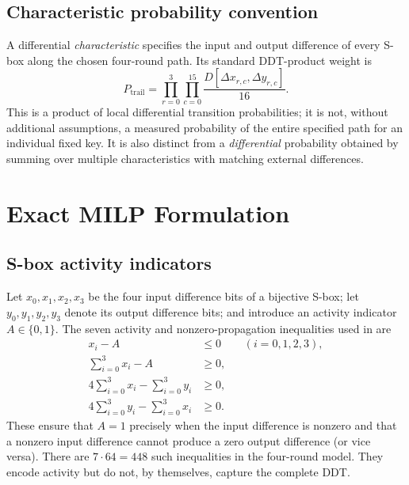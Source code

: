 \documentclass[11pt,a4paper]{article}
\begin{document}
\subsection{Characteristic probability convention}
A differential \emph{characteristic} specifies the input and output difference
of every S-box along the chosen four-round path. Its standard DDT-product weight is
\begin{equation}\label{eq:trail-prob}
 P_{\mathrm{trail}}=\prod_{r=0}^{3}\prod_{c=0}^{15}
 \frac{D[\Delta x_{r,c},\Delta y_{r,c}]}{16}.
\end{equation}
This is a product of local differential transition probabilities; it is not,
without additional assumptions, a measured probability of the entire specified
path for an individual fixed key. It is also distinct from a \emph{differential}
probability obtained by summing over multiple characteristics with matching
external differences.

\section{Exact MILP Formulation}
\subsection{S-box activity indicators}
Let $x_0,x_1,x_2,x_3$ be the four input difference bits of a bijective S-box;
let $y_0,y_1,y_2,y_3$ denote its output difference bits; and introduce an
activity indicator $A\in\{0,1\}$. The seven activity and nonzero-propagation
inequalities used in \cite[Sec.~4.1]{ilter2023} are
\begin{align}
 x_i-A&\leq 0 &&(i=0,1,2,3),\label{eq:act}\\
 \sum_{i=0}^{3}x_i-A&\geq 0,\label{eq:act-lower}\\
 4\sum_{i=0}^{3}x_i-\sum_{i=0}^{3}y_i&\geq0,\\
 4\sum_{i=0}^{3}y_i-\sum_{i=0}^{3}x_i&\geq0.
\end{align}
These ensure that $A=1$ precisely when the input difference is nonzero and
that a nonzero input difference cannot produce a zero output difference (or
vice versa). There are $7\cdot64=448$ such inequalities in the four-round model.
They encode activity but do not, by themselves, capture the complete DDT.
\end{document}
